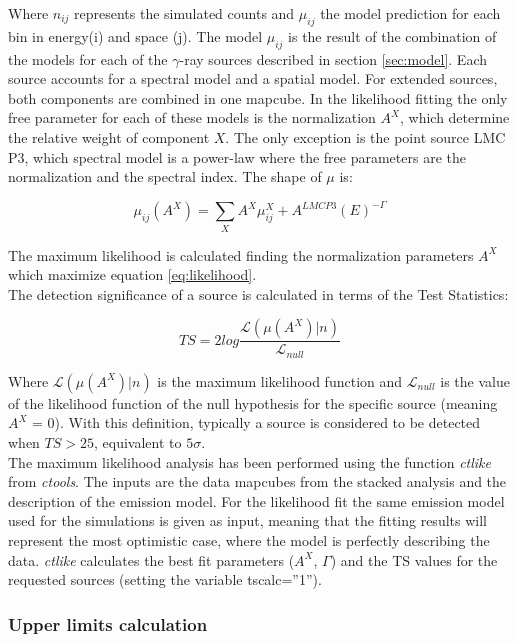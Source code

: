 \documentclass[main.tex]{subfiles}
\begin{document}
Where $n_{ij}$ represents the simulated counts and $\mu_{ij}$ the model prediction for each bin in energy(i) and space (j). The model $\mu_{ij}$ is the result of the combination of the models for each of the $\gamma$-ray sources described in section \ref{sec:model}. Each source accounts for a spectral model and a spatial model. For extended sources, both components are combined in one mapcube. In the likelihood fitting the only free parameter for each of these models is the normalization $A^{X}$, which determine the relative weight of component $X$. The only exception is the point source LMC P3, which spectral model is a power-law where the free parameters are the normalization and the spectral index. The shape of $\mu$ is:

\begin{equation}
  \mu_{ij}(A^{X}) = \sum_{X} A^{X} \mu^{X}_{ij} + A^{LMC P3}(E)^{-\Gamma}
\end{equation}

The maximum likelihood is calculated finding the normalization parameters $A^{X}$ which maximize equation \ref{eq:likelihood}.\\
The detection significance of a source is calculated in terms of the Test Statistics:

\begin{equation}
  TS = 2log \frac{\mathcal{L}(\mu(A^{X})|n)}{\mathcal{L}_{null}}
  \label{eq:ts}
\end{equation}

Where $\mathcal{L}(\mu(A^{X})|n)$ is the maximum likelihood function and $\mathcal{L}_{null}$ is the value of the likelihood function of the null hypothesis for the specific source (meaning $A^X$ = 0). With this definition, typically a source is considered to be detected when $TS>25$, equivalent to $5\sigma$.\\
The maximum likelihood analysis has been performed using the function \textit{ctlike} from \textit{ctools}. The inputs are the data mapcubes from the stacked analysis and the description of the emission model. For the likelihood fit the same emission model used for the simulations is given as input, meaning that the fitting results will represent the most optimistic case, where the model is perfectly describing the data. \textit{ctlike} calculates the best fit parameters ($A^X$, $\Gamma$) and the TS values for the requested sources (setting the variable tscalc=''1'').

\subsubsection{Upper limits calculation} \label{sec:ulimits}
\end{document}
